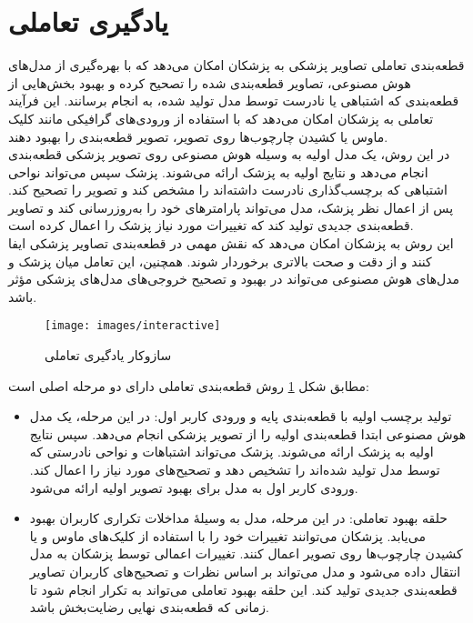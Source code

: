 \section{یادگیری تعاملی}
قطعه‌بندی تعاملی تصاویر پزشکی به پزشکان امکان می‌دهد که با بهره‌گیری از مدل‌های هوش مصنوعی، تصاویر قطعه‌بندی شده را تصحیح کرده و بهبود بخش‌هایی از ‌قطعه‌بندی که اشتباهی یا نادرست توسط مدل تولید شده، به انجام برسانند. این فرآیند تعاملی به پزشکان امکان می‌دهد که با استفاده از ورودی‌های گرافیکی مانند کلیک ماوس یا کشیدن چارچوب‌ها روی تصویر، تصویر قطعه‌بندی را بهبود دهند.
\\
در این روش، یک مدل اولیه به وسیله هوش مصنوعی روی تصویر پزشکی قطعه‌بندی انجام می‌دهد و نتایج اولیه به پزشک ارائه می‌شوند. پزشک سپس می‌تواند نواحی اشتباهی که برچسب‌گذاری نادرست داشته‌اند را مشخص کند و تصویر را تصحیح کند. پس از اعمال نظر پزشک، مدل می‌تواند پارامترهای خود را به‌روزرسانی کند و تصاویر قطعه‌بندی جدیدی تولید کند که تغییرات مورد نیاز پزشک را اعمال کرده است.
\\
این روش به پزشکان امکان می‌دهد که نقش مهمی در قطعه‌بندی تصاویر پزشکی ایفا کنند و از دقت و صحت بالاتری برخوردار شوند. همچنین، این تعامل میان پزشک و مدل‌های هوش مصنوعی می‌تواند در بهبود و تصحیح خروجی‌های مدل‌های پزشکی مؤثر باشد.

\begin{figure}[h]
\centerline{\texttt{[image: images/interactive]}}
\caption[\hspace{0.5em}سازوکار یادگیری تعاملی]{سازوکار یادگیری تعاملی\cite{wang2022medical}}
\label{fig:interactive}
\end{figure}
مطابق شکل \ref{fig:interactive} روش قطعه‌بندی تعاملی دارای دو مرحله اصلی است:

\begin{itemize}
    \item تولید برچسب اولیه با قطعه‌بندی پایه و ورودی کاربر اول:
در این مرحله، یک مدل هوش مصنوعی ابتدا قطعه‌بندی اولیه را از تصویر پزشکی انجام می‌دهد. سپس نتایج اولیه به پزشک ارائه می‌شوند. پزشک می‌تواند اشتباهات و نواحی نادرستی که توسط مدل تولید شده‌اند را تشخیص دهد و تصحیح‌های مورد نیاز را اعمال کند. ورودی کاربر اول به مدل برای بهبود تصویر اولیه ارائه می‌شود.
    \item حلقه بهبود تعاملی:
در این مرحله، مدل به وسیلهٔ مداخلات تکراری کاربران بهبود می‌یابد. پزشکان می‌توانند تغییرات خود را با استفاده از کلیک‌های ماوس و یا کشیدن چارچوب‌ها روی تصویر اعمال کنند. تغییرات اعمالی توسط پزشکان به مدل انتقال داده می‌شود و مدل می‌تواند بر اساس نظرات و تصحیح‌های کاربران تصاویر قطعه‌بندی جدیدی تولید کند. این حلقه بهبود تعاملی می‌تواند به تکرار انجام شود تا زمانی که قطعه‌بندی نهایی رضایت‌بخش باشد.

\end{itemize}
 

